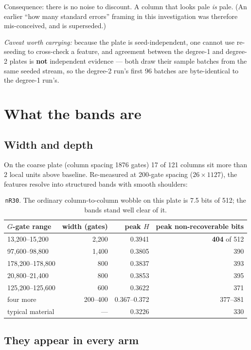 \documentclass[11pt]{article}
\newcommand{\code}[1]{\texttt{#1}}
\begin{document}
Consequence: there is no noise to discount. A column that looks pale
\emph{is} pale. (An earlier ``how many standard errors'' framing in this
investigation was therefore mis-conceived, and is superseded.)

\emph{Caveat worth carrying:} because the plate is seed-independent, one
cannot use re-seeding to cross-check a feature, and agreement between the
degree-1 and degree-2 plates is \textbf{not} independent evidence --- both
draw their sample batches from the same seeded stream, so the degree-2
run's first 96 batches are byte-identical to the degree-1 run's.

\section{What the bands are}

\subsection{Width and depth}

On the coarse plate (column spacing 1876 gates) 17 of 121 columns sit more
than $2$ local units above baseline. Re-measured at 200-gate spacing
($26 \times 1127$), the features resolve into structured bands with smooth
shoulders:

\begin{table}[h]\centering\small
\begin{tabular}{lrrr}
\toprule
$G$-gate range & width (gates) & peak $H$ & peak non-recoverable bits \\
\midrule
13{,}200--15{,}200 & 2{,}200 & 0.3941 & \textbf{404} of 512 \\
97{,}600--98{,}800 & 1{,}400 & 0.3805 & 390 \\
178{,}200--178{,}800 & 800 & 0.3837 & 393 \\
20{,}800--21{,}400 & 800 & 0.3853 & 395 \\
125{,}200--125{,}600 & 600 & 0.3622 & 371 \\
four more & 200--400 & 0.367--0.372 & 377--381 \\
\midrule
typical material & --- & 0.3226 & 330 \\
\bottomrule
\end{tabular}
\caption{\code{nR30}. The ordinary column-to-column wobble on this plate is
7.5 bits of 512; the bands stand well clear of it.}
\end{table}

\subsection{They appear in every arm}
\end{document}
